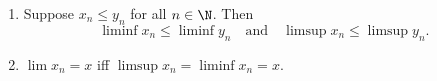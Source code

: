 \begin{theorem} \leavevmode
    \begin{enumerate}[label=(\arabic*)]
        \item Suppose $x_n \le y_n$ for all $n \in \N$.
        Then \[
            \liminf x_n \le \liminf y_n \quad \text{and} \quad
            \limsup x_n \le \limsup y_n.
        \]
        \item $\lim x_n = x$ iff $\limsup x_n = \liminf x_n = x$.
    \end{enumerate}
\end{theorem}
